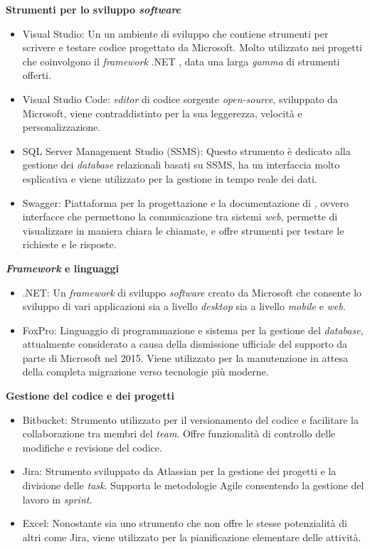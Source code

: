 \textbf{Strumenti per lo sviluppo \textit{software}}
\begin{itemize}
  \item Visual Studio: Un  un ambiente di sviluppo che contiene strumenti per scrivere e testare codice progettato da Microsoft. Molto utilizzato nei progetti che coinvolgono il \textit{framework} .NET , data una larga \textit{gamma} di strumenti offerti.
  \item Visual Studio Code: \textit{editor} di codice sorgente \textit{open-source}, sviluppato da Microsoft, viene contraddistinto per la sua leggerezza, velocità e personalizzazione.
  \item SQL Server Management Studio (SSMS): Questo strumento è dedicato alla gestione dei \textit{database} relazionali basati su SSMS, ha un interfaccia molto esplicativa e viene utilizzato per la gestione in tempo reale dei dati.
  \item Swagger: Piattaforma per la progettazione e la documentazione di  , ovvero interfacce che permettono la comunicazione tra sistemi \textit{web}, permette di visualizzare in maniera chiara le chiamate, e offre strumenti per testare le richieste e le risposte.
\end{itemize}
\textbf{\textit{Framework} e linguaggi}
\begin{itemize}
  \item .NET: Un \textit{framework} di sviluppo \textit{software} creato da Microsoft che consente lo sviluppo di vari applicazioni sia a livello \textit{desktop} sia a livello \textit{mobile} e \textit{web}. 
  \item FoxPro: Linguaggio di programmazione e sistema per la gestione del \textit{database}, attualmente considerato \textit{} a causa della dismissione ufficiale del supporto da parte di Microsoft nel 2015. Viene utilizzato per la manutenzione in attesa della completa migrazione verso tecnologie più moderne.
\end{itemize}

\textbf{Gestione del codice e dei progetti}
\begin{itemize}
  \item Bitbucket: Strumento utilizzato per il versionamento del codice e facilitare la collaborazione tra membri del \textit{team}. Offre funzionalità di controllo delle modifiche e revisione del codice. 
  \item Jira: Strumento sviluppato da Atlassian per la gestione dei progetti e la divisione delle \textit{task}. Supporta le metodologie Agile consentendo la gestione del lavoro in \textit{sprint}.
  \item Excel: Nonostante sia uno strumento che non offre le stesse potenzialità di altri come Jira, viene utilizzato per la pianificazione elementare delle attività.
\end{itemize}

